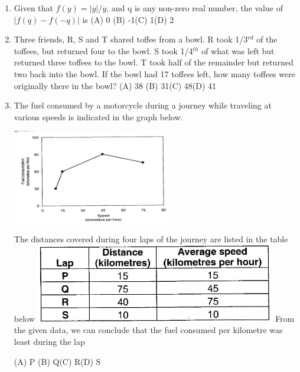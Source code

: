 \documentclass[journal]{IEEEtran}
\begin{document}
\begin{enumerate}
\begin{itemize}
		\end{itemize}

	\item{ 
Given that $f(y) =|y|/y$, and q is any non-zero real number, the value of $|f(q) - f(-q) |$ is
}
		\newline(A) 0 \hspace{10mm} (B) -1\hspace{10mm}(C) 1\hspace{10mm}(D) 2
	\item{ Three friends, R, S and T shared toffee from a bowl. R took 1/3$^{rd}$ of the toffees, but returned four to the bowl. S took 1/4$^{th}$ of what was left but returned three toffees to the bowl. T took half of the remainder but returned two back into the bowl. If the bowl had 17 toffees left, how many toffees were originally there in the bowl?}
	\newline(A) 38 \hspace{10mm} (B) 31\hspace{10mm}(C) 48\hspace{10mm}(D) 41
\item{ The fuel consumed by a motorcycle during a journey while traveling at various speeds is indicated in the graph below.
	\begin{center}
	\includegraphics[width=7cm]{1}
	\end{center}
The distances covered during four laps of the journey are listed in the table below
	\includegraphics[width=\textwidth]{2}
From the given data, we can conclude that the fuel consumed per kilometre was least during the lap} 

	
		(A) P \hspace{10mm} (B) Q\hspace{10mm}(C) R\hspace{10mm}(D) S
\end{enumerate}
\end{document}
